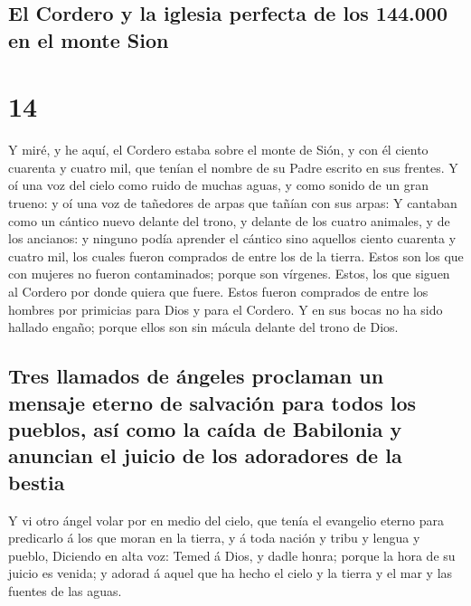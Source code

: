 \hypertarget{el-cordero-y-la-iglesia-perfecta-de-los-144.000-en-el-monte-sion}{%
\subsection{El Cordero y la iglesia perfecta de los 144.000 en el monte
Sion}\label{el-cordero-y-la-iglesia-perfecta-de-los-144.000-en-el-monte-sion}}

\hypertarget{section-13}{%
\section{14}\label{section-13}}

 Y miré, y he aquí, el Cordero estaba sobre el monte de
Sión, y con él ciento cuarenta y cuatro mil, que tenían el nombre de su
Padre escrito en sus frentes.  Y oí una voz del cielo como
ruido de muchas aguas, y como sonido de un gran trueno: y oí una voz de
tañedores de arpas que tañían con sus arpas:  Y cantaban
como un cántico nuevo delante del trono, y delante de los cuatro
animales, y de los ancianos: y ninguno podía aprender el cántico sino
aquellos ciento cuarenta y cuatro mil, los cuales fueron comprados de
entre los de la tierra.  Estos son los que con mujeres no
fueron contaminados; porque son vírgenes. Estos, los que siguen al
Cordero por donde quiera que fuere. Estos fueron comprados de entre los
hombres por primicias para Dios y para el Cordero.  Y en
sus bocas no ha sido hallado engaño; porque ellos son sin mácula delante
del trono de Dios.

\hypertarget{tres-llamados-de-uxe1ngeles-proclaman-un-mensaje-eterno-de-salvaciuxf3n-para-todos-los-pueblos-asuxed-como-la-cauxedda-de-babilonia-y-anuncian-el-juicio-de-los-adoradores-de-la-bestia}{%
\subsection{Tres llamados de ángeles proclaman un mensaje eterno de
salvación para todos los pueblos, así como la caída de Babilonia y
anuncian el juicio de los adoradores de la
bestia}\label{tres-llamados-de-uxe1ngeles-proclaman-un-mensaje-eterno-de-salvaciuxf3n-para-todos-los-pueblos-asuxed-como-la-cauxedda-de-babilonia-y-anuncian-el-juicio-de-los-adoradores-de-la-bestia}}

 Y vi otro ángel volar por en medio del cielo, que tenía
el evangelio eterno para predicarlo á los que moran en la tierra, y á
toda nación y tribu y lengua y pueblo,  Diciendo en alta
voz: Temed á Dios, y dadle honra; porque la hora de su juicio es venida;
y adorad á aquel que ha hecho el cielo y la tierra y el mar y las
fuentes de las aguas.

